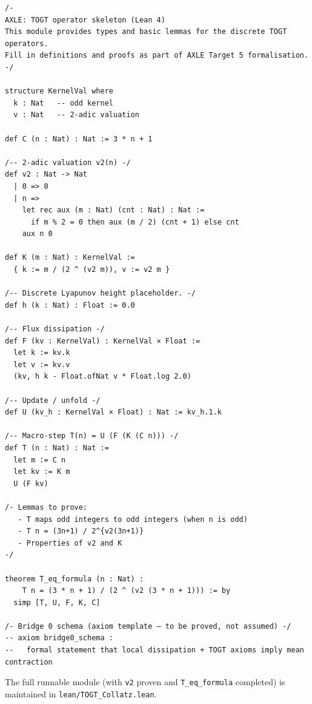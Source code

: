 \documentclass[11pt,a4paper]{article}
\theoremstyle{definition}
\theoremstyle{plain}
\begin{document}
\begin{verbatim}
/-
AXLE: TOGT operator skeleton (Lean 4)
This module provides types and basic lemmas for the discrete TOGT operators.
Fill in definitions and proofs as part of AXLE Target 5 formalisation.
-/

structure KernelVal where
  k : Nat   -- odd kernel
  v : Nat   -- 2-adic valuation

def C (n : Nat) : Nat := 3 * n + 1

/-- 2-adic valuation v2(n) -/
def v2 : Nat -> Nat
  | 0 => 0
  | n =>
    let rec aux (m : Nat) (cnt : Nat) : Nat :=
      if m % 2 = 0 then aux (m / 2) (cnt + 1) else cnt
    aux n 0

def K (m : Nat) : KernelVal :=
  { k := m / (2 ^ (v2 m)), v := v2 m }

/-- Discrete Lyapunov height placeholder. -/
def h (k : Nat) : Float := 0.0

/-- Flux dissipation -/
def F (kv : KernelVal) : KernelVal × Float :=
  let k := kv.k
  let v := kv.v
  (kv, h k - Float.ofNat v * Float.log 2.0)

/-- Update / unfold -/
def U (kv_h : KernelVal × Float) : Nat := kv_h.1.k

/-- Macro-step T(n) = U (F (K (C n))) -/
def T (n : Nat) : Nat :=
  let m := C n
  let kv := K m
  U (F kv)

/- Lemmas to prove:
   - T maps odd integers to odd integers (when n is odd)
   - T n = (3n+1) / 2^{v2(3n+1)}
   - Properties of v2 and K
-/

theorem T_eq_formula (n : Nat) :
    T n = (3 * n + 1) / (2 ^ (v2 (3 * n + 1))) := by
  simp [T, U, F, K, C]

/- Bridge 0 schema (axiom template — to be proved, not assumed) -/
-- axiom bridge0_schema :
--   formal statement that local dissipation + TOGT axioms imply mean contraction
\end{verbatim}

The full runnable module (with \texttt{v2} proven and \texttt{T\_eq\_formula} completed) is
maintained in \texttt{lean/TOGT\_Collatz.lean}.
\end{document}

